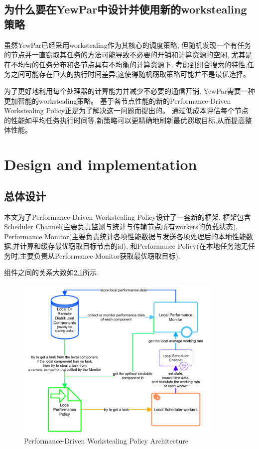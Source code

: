 \documentclass{mproj}
\begin{document}
\section{为什么要在YewPar中设计并使用新的workstealing策略}

虽然YewPar已经采用workstealing作为其核心的调度策略,
但随机发现一个有任务的节点并一直窃取其任务的方法可能导致不必要的开销和计算资源的空闲,
尤其是在不均匀的任务分布和各节点具有不均衡的计算资源下.
考虑到组合搜索的特性,任务之间可能存在巨大的执行时间差异,这使得随机窃取策略可能并不是最优选择。

为了更好地利用每个处理器的计算能力并减少不必要的通信开销,
YewPar需要一种更加智能的workstealing策略。
基于各节点性能的新的Performance-Driven Workstealing Policy正是为了解决这一问题而提出的。
通过低成本评估每个节点的性能如平均任务执行时间等,新策略可以更精确地刷新最优窃取目标,从而提高整体性能。

\chapter{Design and implementation}\label{design}

\section{总体设计}

本文为了Performance-Driven Workstealing Policy设计了一套新的框架,
框架包含Scheduler Channel(主要负责监测与统计与传输节点所有workers的负载状态),
Performance Monitor(主要负责统计各项性能数据与发送各项处理后的本地性能数据,并计算和缓存最优窃取目标节点的id),
和Performance Policy(在本地任务池无任务时,主要负责从Performance Monitor获取最优窃取目标).

组件之间的关系大致如\cref{fig:overall_architecture}所示.
\begin{figure}[h] %
    \centering %
    \includegraphics[width=0.9\textwidth]{images/overall_architecture.pdf} %
    \caption{Performance-Driven Workstealing Policy Architecture} %
    \label{fig:overall_architecture} %
\end{figure}
\FloatBarrier
\end{document}
